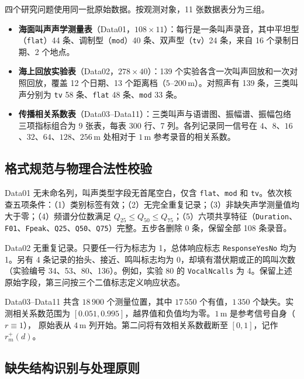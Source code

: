 \documentclass{apmcmthesis}
\begin{document}
四个研究问题使用同一批原始数据。按观测对象，11 张数据表分为三组。
\begin{itemize}
    \item \textbf{海面叫声声学测量表}（Data01，$108\times11$）：每行是一条叫声录音，其中平坦型（\texttt{flat}）44 条、调制型（\texttt{mod}）40 条、双声型（\texttt{tv}）24 条，来自 16 个录制日期、2 个地点。
    \item \textbf{海上回放实验表}（Data02，$278\times40$）：139 个实验各含一次叫声回放和一次对照回放，覆盖 12 个日期、13 个距离档（$5$--$200\,\mathrm{m}$）。对照声有 139 条，三类叫声分别为 \texttt{tv} 58 条、\texttt{flat} 48 条、\texttt{mod} 33 条。
    \item \textbf{传播相关系数表}（Data03--Data11）：三类叫声与语谱图、振幅谱、振幅包络三项指标组合为 9 张表，每表 300 行、7 列。各列记录同一信号在 $4$、$8$、$16$、$32$、$64$、$128$、$256\,\mathrm{m}$ 处相对于 $1\,\mathrm{m}$ 参考录音的相关系数。
\end{itemize}

\subsection{格式规范与物理合法性校验}

Data01 无未命名列，叫声类型字段无首尾空白，仅含 \texttt{flat}、\texttt{mod} 和 \texttt{tv}。依次核查五项条件：（1）类别标签有效；（2）无完全重复记录；（3）非缺失声学测量值均大于零；（4）频谱分位数满足 $Q_{25}\leq Q_{50}\leq Q_{75}$；（5）六项共享特征（\texttt{Duration}、\texttt{F01}、\texttt{Fpeak}、\texttt{Q25}、\texttt{Q50}、\texttt{Q75}）完整。五步各删除 0 条，保留全部 108 条录音。

Data02 无重复记录。只要任一行为标志为 1，总体响应标志 \texttt{ResponseYesNo} 均为 1。另有 4 条记录的抬头、接近、鸣叫标志均为 0，却填有潜伏期或正的鸣叫次数（实验编号 34、53、80、136）。例如，实验 80 的 \texttt{VocalNcalls} 为 4。保留上述原始字段，第三问按三个二值标志定义响应状态。

Data03--Data11 共含 $18\,900$ 个测量位置，其中 $17\,550$ 个有值，$1\,350$ 个缺失。实测相关系数范围为 $[0.051,0.995]$，越界值和负值均为零。$1\,\mathrm{m}$ 是参考信号自身（$r\equiv1$），
原始表从 $4\,\mathrm{m}$ 列开始。第二问将有效相关系数截断至 $[0,1]$，记作 $r_m^+(d)$。

\subsection{缺失结构识别与处理原则}
\end{document}
